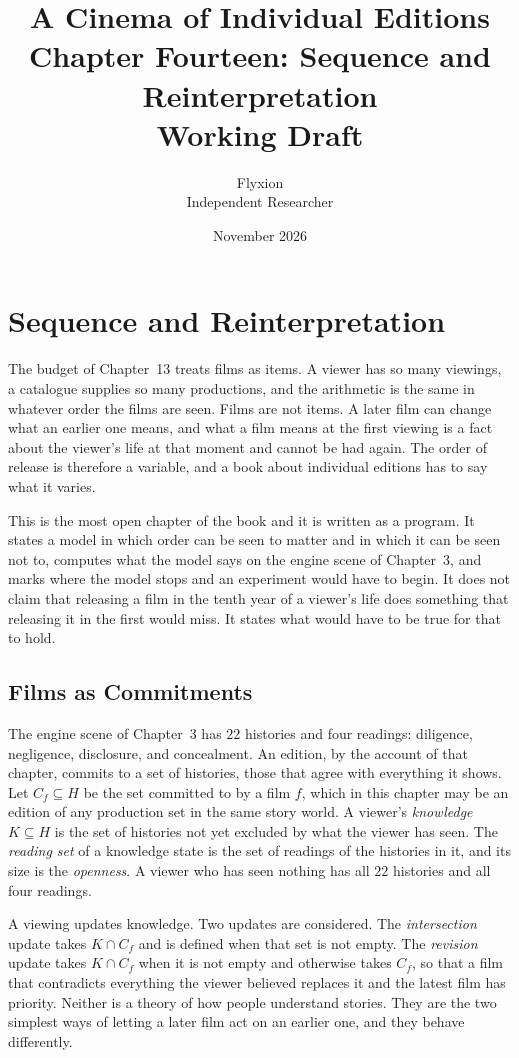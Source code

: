 \documentclass[11pt,twoside,openright]{book}
\title{\Huge\bfseries A Cinema of Individual Editions\\[1.2ex]
\large Chapter Fourteen: Sequence and Reinterpretation\\[0.4ex]
\large Working Draft}
\author{Flyxion\\[0.3ex]\small Independent Researcher}
\date{November 2026}
\theoremstyle{plain}
\theoremstyle{definition}
\theoremstyle{remark}
\begin{document}
\frontmatter
\maketitle
\tableofcontents
\mainmatter
\setcounter{chapter}{13}

\chapter{Sequence and Reinterpretation}
\label{ch:sequence}

The budget of Chapter~13 treats films as items. A viewer has so many viewings, a catalogue supplies so many productions, and the arithmetic is the same in whatever order the films are seen. Films are not items. A later film can change what an earlier one means, and what a film means at the first viewing is a fact about the viewer's life at that moment and cannot be had again. The order of release is therefore a variable, and a book about individual editions has to say what it varies.

This is the most open chapter of the book and it is written as a program. It states a model in which order can be seen to matter and in which it can be seen not to, computes what the model says on the engine scene of Chapter~3, and marks where the model stops and an experiment would have to begin. It does not claim that releasing a film in the tenth year of a viewer's life does something that releasing it in the first would miss. It states what would have to be true for that to hold.

\section{Films as Commitments}\label{sec:commit14}

The engine scene of Chapter~3 has $22$ histories and four readings: diligence, negligence, disclosure, and concealment. An edition, by the account of that chapter, commits to a set of histories, those that agree with everything it shows. Let $C_f\subseteq H$ be the set committed to by a film $f$, which in this chapter may be an edition of any production set in the same story world. A viewer's \emph{knowledge} $K\subseteq H$ is the set of histories not yet excluded by what the viewer has seen. The \emph{reading set} of a knowledge state is the set of readings of the histories in it, and its size is the \emph{openness}. A viewer who has seen nothing has all $22$ histories and all four readings.

A viewing updates knowledge. Two updates are considered. The \emph{intersection} update takes $K\cap C_f$ and is defined when that set is not empty. The \emph{revision} update takes $K\cap C_f$ when it is not empty and otherwise takes $C_f$, so that a film that contradicts everything the viewer believed replaces it and the latest film has priority. Neither is a theory of how people understand stories. They are the two simplest ways of letting a later film act on an earlier one, and they behave differently.
\end{document}
